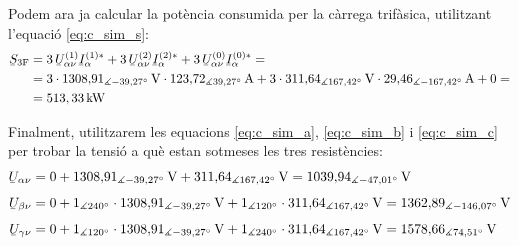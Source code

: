 \begin{exemple}
Podem ara ja calcular la pot\`{e}ncia consumida per la c\`{a}rrega
trif\`{a}sica, utilitzant l'equaci\'{o} \eqref{eq:c_sim_s}:
\[
\begin{split}
\cmplx{S}\ped{3F} &=  3\, \cmplx{U}_{\alpha\nu}^{(1)}
\cmplx{I}_\alpha^{(1)*} + 3\, \cmplx{U}_{\alpha\nu}^{(2)}
\cmplx{I}_\alpha^{(2)*} +  3\,
\cmplx{U}_{\alpha\nu}^{(0)}  \cmplx{I}_\alpha^{(0)*} = \\
&= 3 \cdot 1308{,}91_{\measuredangle -39{,}27\degree}\unit{V} \cdot
123{,}72_{\measuredangle 39{,}27\degree}\unit{A} + 3 \cdot
311{,}64_{\measuredangle
167{,}42\degree}\unit{V} \cdot 29{,}46_{\measuredangle -167{,}42\degree}\unit{A} + 0 = \\
&= 513{,33}\unit{kW}
\end{split}
\]

Finalment, utilitzarem les equacions \eqref{eq:c_sim_a},
\eqref{eq:c_sim_b} i \eqref{eq:c_sim_c} per trobar la tensi\'{o} a qu\`{e}
estan sotmeses les tres resist\`{e}ncies:
\begin{align*}
    \cmplx{U}_{\alpha\nu} &= 0 + 1308{,}91_{\measuredangle -39{,}27\degree}\unit{V} +
    311{,}64_{\measuredangle 167{,}42\degree}\unit{V}  =
    1039{,}94_{\measuredangle -47{,}01\degree}\unit{V} \\[1ex]
    \cmplx{U}_{\beta\nu} &= 0 + 1_{\measuredangle 240\degree} \cdot
    1308{,}91_{\measuredangle -39{,}27\degree}\unit{V} +
    1_{\measuredangle 120\degree} \cdot
    311{,}64_{\measuredangle 167{,}42\degree}\unit{V}  =
    1362{,}89_{\measuredangle -146{,}07\degree}\unit{V}    \\[1ex]
    \cmplx{U}_{\gamma\nu} &= 0 + 1_{\measuredangle 120\degree} \cdot
    1308{,}91_{\measuredangle -39{,}27\degree}\unit{V} +
    1_{\measuredangle 240\degree} \cdot 311{,}64_{\measuredangle 167{,}42\degree}\unit{V}  =
    1578{,}66_{\measuredangle 74{,}51\degree}\unit{V}
\end{align*}
\end{exemple}
